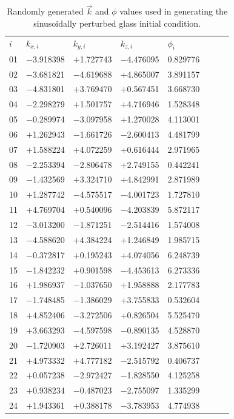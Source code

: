 \documentclass[fleq,usenatbib]{mnras}
\begin{document}
\begin{table}
	\centering
	\caption{Randomly generated $\vec{k}$ and $\phi$ values used in generating 
             the sinusoidally perturbed glass initial condition.}
	\label{tab:modes}
	\begin{tabular}{llllllll} %
		\hline
		$i$ & $k_{x,i}$ & $k_{y,i}$ & $k_{z,i}$ & $\phi_i$ \\
01 & $-$3.918398 & $+$1.727743 & $-$4.476095 & 0.829776 \\
02 & $-$3.681821 & $-$4.619688 & $+$4.865007 & 3.891157 \\
03 & $-$4.831801 & $+$3.769470 & $+$0.567451 & 3.668730 \\
04 & $-$2.298279 & $+$1.501757 & $+$4.716946 & 1.528348 \\
05 & $-$0.289974 & $-$3.097958 & $+$1.270028 & 4.113001 \\
06 & $+$1.262943 & $-$1.661726 & $-$2.600413 & 4.481799 \\
07 & $+$1.588224 & $+$4.072259 & $+$0.616444 & 2.971965 \\
08 & $-$2.253394 & $-$2.806478 & $+$2.749155 & 0.442241 \\
09 & $-$1.432569 & $+$3.324710 & $+$4.842991 & 2.871989 \\
10 & $+$1.287742 & $-$4.575517 & $-$4.001723 & 1.727810 \\
11 & $+$4.769704 & $+$0.540096 & $-$4.203839 & 5.872117 \\
12 & $-$3.013200 & $-$1.871251 & $-$2.514416 & 1.574008 \\
13 & $-$4.588620 & $+$4.384224 & $+$1.246849 & 1.985715 \\
14 & $-$0.372817 & $+$0.195243 & $+$4.074056 & 6.248739 \\
15 & $-$1.842232 & $+$0.901598 & $-$4.453613 & 6.273336 \\
16 & $+$1.986937 & $-$1.037650 & $+$1.958888 & 2.177783 \\
17 & $-$1.748485 & $-$1.386029 & $+$3.755833 & 0.532604 \\
18 & $+$4.852406 & $-$3.272506 & $+$0.826504 & 5.525470 \\
19 & $+$3.663293 & $-$4.597598 & $-$0.890135 & 4.528870 \\
20 & $-$1.720903 & $+$2.726011 & $+$3.192427 & 3.875610 \\
21 & $+$4.973332 & $+$4.777182 & $-$2.515792 & 0.406737 \\
22 & $+$0.057238 & $-$2.972427 & $-$1.828550 & 4.125258 \\
23 & $+$0.938234 & $-$0.487023 & $-$2.755097 & 1.335299 \\
24 & $+$1.943361 & $+$0.388178 & $-$3.783953 & 4.774938 \\
		\hline
	\end{tabular}
\end{table}
\end{document}
